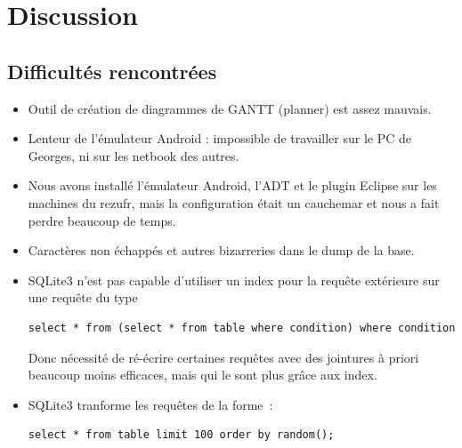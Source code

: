 \documentclass[a4paper,11pt,french]{article}
\def\android{Android\texttrademark{}}
\begin{document}
{\section{Discussion}
\subsection{Difficultés rencontrées}
\label{sec:difficultes}
\begin{itemize}
\item Outil de création de diagrammes de GANTT (planner) est assez mauvais.
\item Lenteur de l'émulateur \android{} : impossible de travailler sur le PC de Georges, ni sur les netbook des autres.
\item Nous avons installé l'émulateur \android{}, l'ADT et le plugin Eclipse sur les machines du rezufr, mais la configuration était un
  cauchemar et nous a fait perdre beaucoup de temps.
\item Caractères non échappés et autres bizarreries dans le dump de la base.
\item SQLite3 n'est pas capable d'utiliser un index pour la requête extérieure sur une requête du type

\begin{verbatim}
select * from (select * from table where condition) where condition
\end{verbatim}

Donc nécessité de ré-écrire certaines requêtes avec des jointures à priori beaucoup moins efficaces, mais qui le sont plus grâce aux index.
\item SQLite3 tranforme les requêtes de la forme~:

\begin{verbatim}
select * from table limit 100 order by random();
\end{verbatim}


\end{itemize}}
\end{document}
